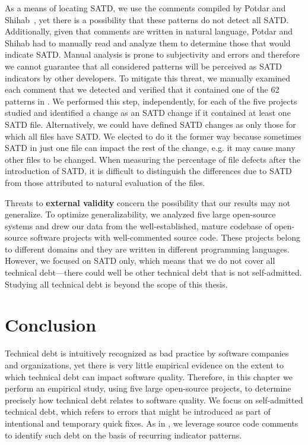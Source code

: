 As a means of locating SATD, we use the comments compiled by Potdar and Shihab~\cite{ICSM_PotdarS14}, yet there is a possibility that these patterns do not detect all SATD. Additionally, given that comments are written in natural language, Potdar and Shihab had to manually read and analyze them to determine those that would indicate SATD. Manual analysis is prone to subjectivity and errors and therefore we cannot guarantee that all considered patterns will be perceived as SATD indicators by other developers. To mitigate this threat, we manually examined each comment that we detected and verified that it contained one of the 62 patterns in \cite{ICSM_PotdarS14}. We performed this step, independently, for each of the five projects studied and identified a change as an SATD change if it contained at least one SATD file. Alternatively, we could have defined SATD changes as only those for which all files have SATD. We elected to do it the former way because sometimes SATD in just one file can impact the rest of the change, e.g. it may cause many other files to be changed. When measuring the percentage of file defects after the introduction of SATD, it is difficult to distinguish the differences due to SATD from those attributed to natural evaluation of the files.



Threats  to {\bf external validity} concern the possibility that our results may not generalize. To optimize generalizability, we analyzed five large open-source systems and drew our data from the well-established, mature codebase of open-source software projects with well-commented source code. These projects belong to different domains and they are written in different programming languages. However, we focused on SATD only, which means that we do not cover all technical debt---there could well be other technical debt that is not self-admitted. Studying all technical debt is beyond the scope of this thesis.





\section{Conclusion}
\label{chap3:sec:conclusion}



Technical debt is intuitively recognized as bad practice by software companies and organizations, yet there is very little empirical evidence on the extent to which technical debt can impact software quality. Therefore, in this chapter we perform an empirical study, using five large open-source projects, to determine precisely how technical debt relates to software quality. We focus on self-admitted technical debt, which refers to  errors that might be introduced as part of intentional and temporary quick fixes. As in  \cite{ICSM_PotdarS14}, we leverage source code comments to identify such debt on the basis of recurring indicator patterns.


